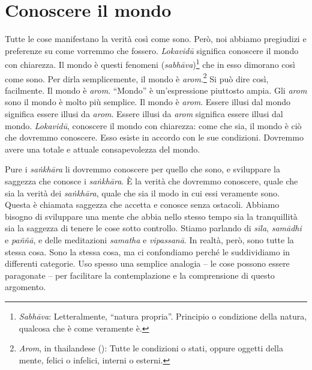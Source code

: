 \chapter{Conoscere il mondo}

Tutte le cose manifestano la verità così come sono. Però, noi abbiamo
pregiudizi e preferenze su come vorremmo che fossero. \emph{Lokavidū}
significa conoscere il mondo con chiarezza. Il mondo è questi fenomeni
(\emph{sabhāva})\footnote{\emph{Sabhāva}: Letteralmente, ``natura
  propria''. Principio o condizione della natura, qualcosa che è come
  veramente è.} che in esso dimorano così come sono. Per dirla
semplicemente, il mondo è \emph{arom}.\footnote{\emph{Arom}, in
  thailandese (): Tutte le condizioni o stati, oppure oggetti
  della mente, felici o infelici, interni o esterni.} Si può dire così,
facilmente. Il mondo è \emph{arom}. ``Mondo'' è un'espressione piuttosto
ampia. Gli \emph{arom} sono il mondo è molto più semplice. Il mondo è
\emph{arom}. Essere illusi dal mondo significa essere illusi da
\emph{arom}. Essere illusi da \emph{arom} significa essere illusi dal
mondo. \emph{Lokavidū}, conoscere il mondo con chiarezza: come che sia,
il mondo è ciò che dovremmo conoscere. Esso esiste in accordo con le sue
condizioni. Dovremmo avere una totale e attuale consapevolezza del
mondo.

Pure i \emph{saṅkhāra} li dovremmo conoscere per quello che sono, e
sviluppare la saggezza che conosce i \emph{saṅkhāra}. È la verità che
dovremmo conoscere, quale che sia la verità dei \emph{saṅkhāra}, quale
che sia il modo in cui essi veramente sono. Questa è chiamata saggezza
che accetta e conosce senza ostacoli. Abbiamo bisogno di sviluppare una
mente che abbia nello stesso tempo sia la tranquillità sia la saggezza
di tenere le cose sotto controllo. Stiamo parlando di \emph{sīla},
\emph{samādhi} e \emph{paññā}, e delle meditazioni \emph{samatha} e
\emph{vipassanā}. In realtà, però, sono tutte la stessa cosa. Sono la
stessa cosa, ma ci confondiamo perché le suddividiamo in differenti
categorie. Uso spesso una semplice analogia -- le cose possono essere
paragonate -- per facilitare la contemplazione e la comprensione di
questo argomento.

